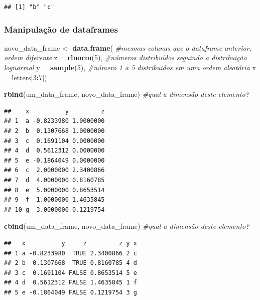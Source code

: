\documentclass[
]{book}
\newenvironment{Shaded}{\begin{snugshade}}{\end{snugshade}}
\newcommand{\AttributeTok}[1]{\textcolor[rgb]{0.13,0.29,0.53}{#1}}
\newcommand{\CommentTok}[1]{\textcolor[rgb]{0.56,0.35,0.01}{\textit{#1}}}
\newcommand{\DecValTok}[1]{\textcolor[rgb]{0.00,0.00,0.81}{#1}}
\newcommand{\FunctionTok}[1]{\textcolor[rgb]{0.13,0.29,0.53}{\textbf{#1}}}
\newcommand{\NormalTok}[1]{#1}
\newcommand{\OtherTok}[1]{\textcolor[rgb]{0.56,0.35,0.01}{#1}}
\newcommand{\SpecialCharTok}[1]{\textcolor[rgb]{0.81,0.36,0.00}{\textbf{#1}}}
\begin{document}
\begin{verbatim}
## [1] "b" "c"
\end{verbatim}

\subsubsection{Manipulação de dataframes}\label{manipulauxe7uxe3o-de-dataframes}

\begin{Shaded}
\begin{Highlighting}[]
\NormalTok{novo\_data\_frame }\OtherTok{\textless{}{-}} \FunctionTok{data.frame}\NormalTok{( }\CommentTok{\#mesmas colunas que o dataframe anterior, ordem diferente}
  \AttributeTok{z =} \FunctionTok{rlnorm}\NormalTok{(}\DecValTok{5}\NormalTok{), }\CommentTok{\#números distribuídos seguindo a distribuição lognormal}
  \AttributeTok{y =} \FunctionTok{sample}\NormalTok{(}\DecValTok{5}\NormalTok{), }\CommentTok{\#número 1 a 5 distribuidos em uma ordem aleatória}
  \AttributeTok{x =}\NormalTok{ letters[}\DecValTok{3}\SpecialCharTok{:}\DecValTok{7}\NormalTok{])}

\FunctionTok{rbind}\NormalTok{(um\_data\_frame, novo\_data\_frame) }\CommentTok{\#qual a dimensão deste elemento?}
\end{Highlighting}
\end{Shaded}

\begin{verbatim}
##    x          y         z
## 1  a -0.8233980 1.0000000
## 2  b  0.1307668 1.0000000
## 3  c  0.1691104 0.0000000
## 4  d  0.5612312 0.0000000
## 5  e -0.1864049 0.0000000
## 6  c  2.0000000 2.3400866
## 7  d  4.0000000 0.8160785
## 8  e  5.0000000 0.8653514
## 9  f  1.0000000 1.4635845
## 10 g  3.0000000 0.1219754
\end{verbatim}

\begin{Shaded}
\begin{Highlighting}[]
\FunctionTok{cbind}\NormalTok{(um\_data\_frame, novo\_data\_frame) }\CommentTok{\#qual a dimensão deste elemento?}
\end{Highlighting}
\end{Shaded}

\begin{verbatim}
##   x          y     z         z y x
## 1 a -0.8233980  TRUE 2.3400866 2 c
## 2 b  0.1307668  TRUE 0.8160785 4 d
## 3 c  0.1691104 FALSE 0.8653514 5 e
## 4 d  0.5612312 FALSE 1.4635845 1 f
## 5 e -0.1864049 FALSE 0.1219754 3 g
\end{verbatim}
\end{document}
